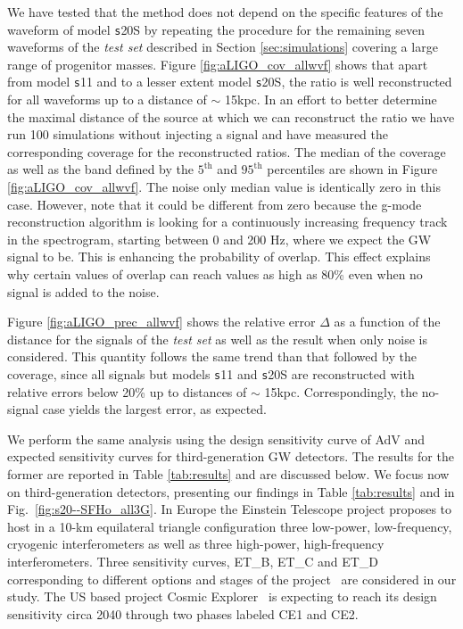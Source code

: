 We have tested that the method does not depend on the specific features of the waveform of model {\texttt s20S} by repeating the procedure for the remaining seven waveforms of the {\it test set} described in Section \ref{sec:simulations} covering
a large range of progenitor masses. Figure \ref{fig:aLIGO_cov_allwvf} shows that apart from model {\texttt s11} and to a lesser extent model {\texttt s20S}, the ratio is well reconstructed for all waveforms up to a distance of $\sim$ 15kpc. In an
effort to better determine the maximal distance of the source at which we can reconstruct the ratio we have run 100 simulations without injecting a signal and have measured the corresponding coverage for the reconstructed ratios.
The median of the coverage as well as the band defined by the $\mathrm{5^{th}}$ and $\mathrm{95^{th}}$ percentiles are shown in Figure \ref{fig:aLIGO_cov_allwvf}.
The noise only median value is identically zero in this case. However, note that it could be different
from zero because
the g-mode reconstruction algorithm is looking for a continuously  increasing frequency track
in the spectrogram, starting between 0 and 200 Hz, where we expect the GW signal to be.
This is enhancing the probability of overlap. This effect explains why certain values of overlap can reach
values as high as 80\% even when no signal is added to the noise.

Figure \ref{fig:aLIGO_prec_allwvf} shows the relative error $\Delta$ as a function of the distance for the signals of the {\it test set}
as well as the result when only noise is considered. This quantity follows the same trend than that followed by the coverage, since all signals but models {\texttt s11} and {\texttt s20S} are reconstructed with relative errors below 20\% up to distances of $\sim$ 15kpc. Correspondingly, the no-signal case yields the largest error, as expected.

We perform the same analysis using the design sensitivity curve of AdV and expected sensitivity curves for third-generation 
GW detectors. The results for the former are reported in Table \ref{tab:results} and are discussed below. We focus now on third-generation detectors, presenting our findings in Table \ref{tab:results} and in Fig.~\ref{fig:s20--SFHo_all3G}. In Europe the Einstein Telescope project proposes to host in a 10-km equilateral triangle configuration three low-power, low-frequency, cryogenic interferometers as well as three high-power, high-frequency interferometers. Three sensitivity curves, ET\_B, ET\_C and ET\_D corresponding to different options and stages of the project~\citep{Hild_2011} are considered in our study. %
The US based project Cosmic Explorer~\citep{reitze2019cosmic} is expecting to reach its design
sensitivity circa 2040 through two phases labeled CE1 and CE2. %

